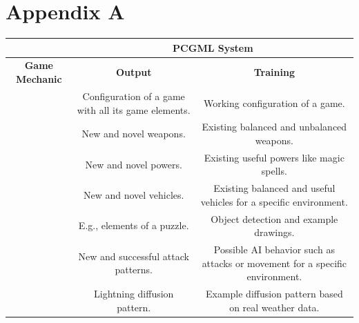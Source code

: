 \documentclass[MGS,Master,english]{twbook}%
\begin{document}
\chapter{Appendix A} \label{gameMechanicIdeaSummary}
\begin{landscape}
	\begin{table}[tp]
		\centering
		\resizebox{\textheight}{!}
		{%
			\begin{tabular}{c|c|c|}
				\cline{2-3}
				\textbf{}                                                                     & \multicolumn{2}{|c|}{\textbf{PCGML System}}                                                                                                   \\ \hline
				\multicolumn{1}{|c||}{\textbf{Game Mechanic}}                                  & \textbf{Output}                                      & \textbf{Training}                                                                     \\ \hline\hline
				\multicolumn{1}{|c||}{\nameref{idea::rulesAndBehavior}}       & Configuration of a game with all its game elements.  & Working configuration of a game.                                                      \\ \hline
				\multicolumn{1}{|c||}{\nameref{idea::changingWeapons}}        & New and novel weapons.                               & Existing balanced and unbalanced weapons.                                             \\ \hline
				\multicolumn{1}{|c||}{\nameref{idea::changingPowers}}         & New and novel powers.                                & Existing useful powers like magic spells.                                             \\ \hline
				\multicolumn{1}{|c||}{\nameref{idea::novelCars}}              & New and novel vehicles.                              & Existing balanced and useful vehicles for a specific environment.                     \\ \hline
				\multicolumn{1}{|c||}{\nameref{idea::solverWeapon}}           & E.g., elements of a puzzle.                          & Object detection and example drawings.                                                \\ \hline
				\multicolumn{1}{|c||}{\nameref{idea::defeatTheEnemy}}         & New and successful attack patterns.                  & Possible AI behavior such as attacks or movement for a specific environment.          \\ \hline
				\multicolumn{1}{|c||}{\nameref{idea::caughtInAThunderstorm}}  & Lightning diffusion pattern.                         & Example diffusion pattern based on real weather data.                                 \\ \hline

\end{tabular}}
\end{table}
\end{landscape}
\end{document}
